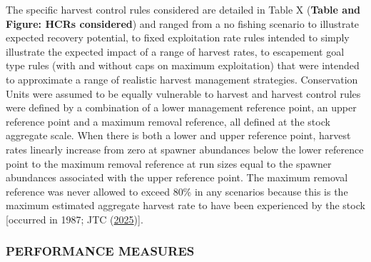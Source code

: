 \documentclass[11pt]{book}
\begin{document}
The specific harvest control rules considered are detailed in Table X (\textbf{Table and Figure: HCRs considered}) and ranged from a no fishing scenario to illustrate expected recovery potential, to fixed exploitation rate rules intended to simply illustrate the expected impact of a range of harvest rates, to escapement goal type rules (with and without caps on maximum exploitation) that were intended to approximate a range of realistic harvest management strategies. Conservation Units were assumed to be equally vulnerable to harvest and harvest control rules were defined by a combination of a lower management reference point, an upper reference point and a maximum removal reference, all defined at the stock aggregate scale. When there is both a lower and upper reference point, harvest rates linearly increase from zero at spawner abundances below the lower reference point to the maximum removal reference at run sizes equal to the spawner abundances associated with the upper reference point. The maximum removal reference was never allowed to exceed 80\% in any scenarios because this is the maximum estimated aggregate harvest rate to have been experienced by the stock {[}occurred in 1987; JTC (\protect\hyperlink{ref-JTC2025Report}{2025}){]}.

\hypertarget{performance-measures}{%
\subsubsection{PERFORMANCE MEASURES}\label{performance-measures}}
\end{document}
